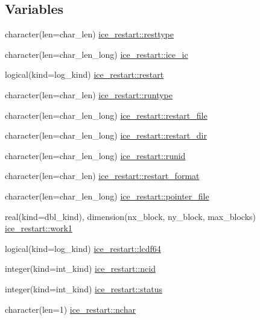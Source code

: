 \subsection*{Variables}
\begin{DoxyCompactItemize}
\item 
character(len=char\_\-len) \hyperlink{namespaceice__restart_aad4e3d73d50c4539a7b1aa3107da64d2}{ice\_\-restart::resttype}
\item 
character(len=char\_\-len\_\-long) \hyperlink{namespaceice__restart_a7b5bbbfe819de3da4a61882a1c69631d}{ice\_\-restart::ice\_\-ic}
\item 
logical(kind=log\_\-kind) \hyperlink{namespaceice__restart_a929c8d9ca4d216b9f6b0e99e89e714fb}{ice\_\-restart::restart}
\item 
character(len=char\_\-len) \hyperlink{namespaceice__restart_a549fe78d0644ff3e150fb73b66c04f1d}{ice\_\-restart::runtype}
\item 
character(len=char\_\-len\_\-long) \hyperlink{namespaceice__restart_afe746728ab31bdadb08208876f3b7f12}{ice\_\-restart::restart\_\-file}
\item 
character(len=char\_\-len\_\-long) \hyperlink{namespaceice__restart_a3a3e9af457ad6b50bfb6574e2d3809c2}{ice\_\-restart::restart\_\-dir}
\item 
character(len=char\_\-len\_\-long) \hyperlink{namespaceice__restart_a7f22ff2f3f9c3ccf57b19309c46deb79}{ice\_\-restart::runid}
\item 
character(len=char\_\-len) \hyperlink{namespaceice__restart_a959bc8a517154ec9d4ab801d5bb2c55f}{ice\_\-restart::restart\_\-format}
\item 
character(len=char\_\-len\_\-long) \hyperlink{namespaceice__restart_a3c4214640f255c7d756076f72b205d0b}{ice\_\-restart::pointer\_\-file}
\item 
real(kind=dbl\_\-kind), dimension(nx\_\-block, ny\_\-block, max\_\-blocks) \hyperlink{namespaceice__restart_a1703b86ac88cd5909cf72e10e6ff140f}{ice\_\-restart::work1}
\item 
logical(kind=log\_\-kind) \hyperlink{namespaceice__restart_aab78d8960dc993e85a64bb42c7031faf}{ice\_\-restart::lcdf64}
\item 
integer(kind=int\_\-kind) \hyperlink{namespaceice__restart_a51c2dfdd011da9a81944ec89a678cc41}{ice\_\-restart::ncid}
\item 
integer(kind=int\_\-kind) \hyperlink{namespaceice__restart_ae323f5dd85b87df694fafe6e4f453e70}{ice\_\-restart::status}
\item 
character(len=1) \hyperlink{namespaceice__restart_a26947e34bc78295d6dad27b3b0295209}{ice\_\-restart::nchar}
\end{DoxyCompactItemize}
